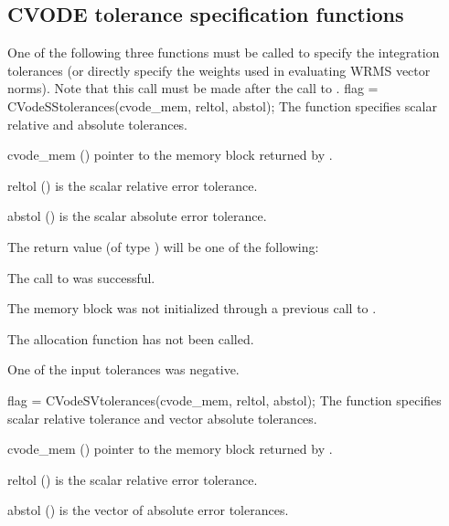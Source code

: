 \subsection{CVODE tolerance specification functions}\label{sss:cvtolerances}
One of the following three functions must be called to specify the integration
tolerances (or directly specify the weights used in evaluating WRMS vector norms).
Note that this call must be made after the call to .
{
  flag = CVodeSStolerances(cvode\_mem, reltol, abstol);
}
{
  The function  specifies scalar relative and absolute
  tolerances.
}
{
  \begin{args}
  \item[cvode\_mem] ()
    pointer to the {\cvode} memory block returned by .
  \item[reltol] ()
    is the scalar relative error tolerance.
  \item[abstol] ()
    is the scalar absolute error tolerance.
  \end{args}
}
{
  The return value  (of type ) will be one of the following:
  \begin{args}
  \item[\Id{CV\_SUCCESS}]
    The call to  was successful.
  \item[\Id{CV\_MEM\_NULL}] 
    The {\cvode} memory block was not initialized through a previous call to
    .
  \item[\Id{CV\_NO\_MALLOC}] 
    The allocation function  has not been called.
  \item[\Id{CV\_ILL\_INPUT}] 
    One of the input tolerances was negative.
  \end{args}
}
{}
{
  flag = CVodeSVtolerances(cvode\_mem, reltol, abstol);
}
{
  The function  specifies scalar relative tolerance and
  vector absolute tolerances.
}
{
  \begin{args}
  \item[cvode\_mem] ()
    pointer to the {\cvode} memory block returned by .
  \item[reltol] ()
    is the scalar relative error tolerance.
  \item[abstol] ()
    is the vector of absolute error tolerances.
  \end{args}
}
